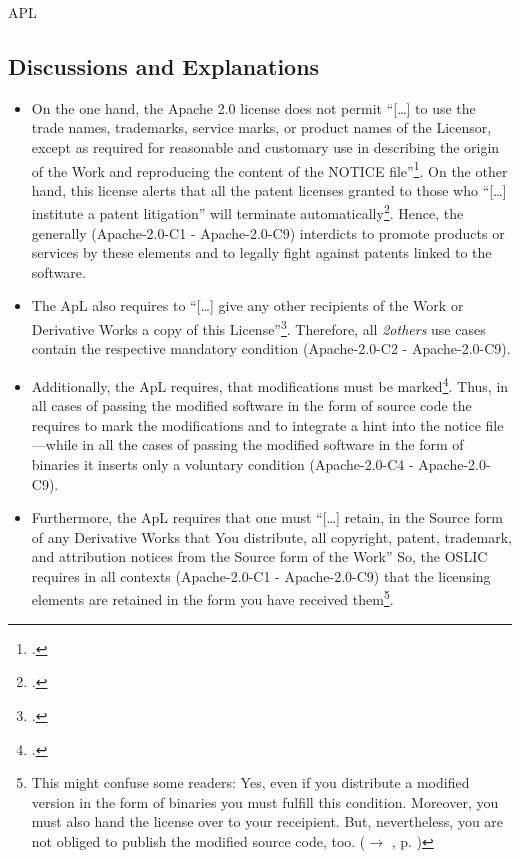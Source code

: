\begin{license}{APL}
\subsection{Discussions and Explanations}
\label{APLDiscussion}
\begin{itemize}
  \item On the one hand, the Apache 2.0 license does not permit
  \enquote{[\ldots] to use the trade names, trademarks, service marks, or
  product names of the Licensor, except as required for reasonable and customary
  use in describing the origin of the Work and reproducing the content of the
  NOTICE file}\footcite[cf.][\nopage wp.\ §6]{Apl20OsiLicense2004a}. On the other
  hand, this license alerts that all the patent licenses granted to those who
  \enquote{[\ldots] institute a patent litigation} will terminate
  automatically\footcite[cf.][\nopage wp.\ §3]{Apl20OsiLicense2004a}. Hence, the
  \oslic{} generally (Apache-2.0-C1 - Apache-2.0-C9) interdicts to promote products or services by
  these elements and to legally fight against patents linked to the software.
  
  \item The ApL also requires to \enquote{[\ldots] give any other recipients of
  the Work or Derivative Works a copy of this License}\footcite[cf.][\nopage wp.\
  §4.1]{Apl20OsiLicense2004a}. Therefore, all \emph{2others} use cases contain
  the respective mandatory condition (Apache-2.0-C2 - Apache-2.0-C9).
   
  \item Additionally, the ApL requires, that modifications must be
  marked\footcite[cf.][\nopage wp.\ §4.2]{Apl20OsiLicense2004a}. Thus, in all
  cases of passing the modified software in the form of source code the \oslic{}
  requires to mark the modifications and to integrate a hint into the notice
  file---while in all the cases of passing the modified software in the form of
  binaries it inserts only a voluntary condition (Apache-2.0-C4 - Apache-2.0-C9).
  
  \item Furthermore, the ApL requires that one must \enquote{[\ldots] retain, in
  the Source form of any Derivative Works that You distribute, all copyright,
  patent, trademark, and attribution notices from the Source form of the Work}
  So, the OSLIC requires in all contexts (Apache-2.0-C1 - Apache-2.0-C9) that the licensing
  elements are retained in the form you have received them\footnote{This might
  confuse some readers: Yes, even if you distribute a modified version in the
  form of binaries you must fulfill this condition. Moreover, you must also hand
  the license over to your receipient. But, nevertheless, you are not obliged to
  publish the modified source code, too. ($\rightarrow$ \oslic, p.
  \protectionpageref{APL})}.
  

\end{itemize}
\end{license}
